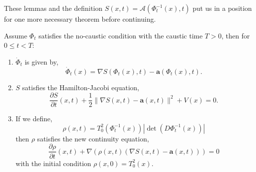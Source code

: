\documentclass[a4paper,12pt,draft]{report}
\begin{document}
These lemmas and the definition $S(x, t) = \mathscr{A}(\Phi_t^{-1}(x), t)$ put us in a position for one more necessary theorem before continuing.
\theorem
{
Assume $\Phi_t$ satisfies the no-caustic condition with the caustic time $T > 0$, then for $0 \le t < T$:
\begin{enumerate}
\item $\dot{\Phi}_t$ is given by,
$$
\dot{\Phi}_t(x) = \nabla S(\Phi_t(x), t) - \mathbf{a}(\Phi_t(x), t).
$$
\item $S$ satisfies the Hamilton-Jacobi equation,
\begin{equation}
\frac{\partial S}{\partial t}(x, t) + \frac{1}{2}\|\nabla S(x, t) - \mathbf{a}(x, t)\|^2 + V(x) = 0. \label{HJE2}
\end{equation}
\item If we define,
$$
\rho(x, t) = T_0^2(\Phi_t^{-1}(x))|\det(D\Phi_t^{-1}(x))|
$$
then $\rho$ satisfies the new continuity equation,
\begin{equation}
\frac{\partial \rho}{\partial t}(x, t) + \nabla(\rho(x, t)(\nabla S(x, t) - \mathbf{a}(x, t))) = 0 \label{CE2}
\end{equation}
with the initial condition $\rho(x, 0) = T_0^2(x)$.
\end{enumerate}
}
\proof
\end{document}

